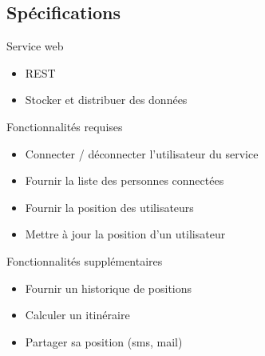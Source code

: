 \documentclass{beamer} %
\begin{document}
  \subsection{Spécifications}
  \begin{frame}{\subsecname}
    \begin{block}{Service web}
      \begin{itemize}
        \item REST
        \item Stocker et distribuer des données
      \end{itemize}
    \end{block}

    \pause

    \begin{alertblock}{Fonctionnalités requises}
      \begin{itemize}
        \item Connecter / déconnecter l'utilisateur du service
        \item Fournir la liste des personnes connectées
        \item Fournir la position des utilisateurs
        \item Mettre à jour la position d'un utilisateur
      \end{itemize}
    \end{alertblock}

    \pause

    \begin{exampleblock}{Fonctionnalités supplémentaires}
      \begin{itemize}
        \item Fournir un historique de positions
        \item Calculer un itinéraire
        \item Partager sa position (sms, mail)
      \end{itemize}
    \end{exampleblock}

  \end{frame}
\end{document}
